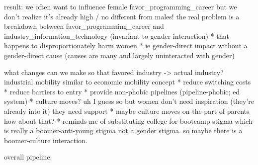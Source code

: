 \documentclass[review]{elsarticle}
\begin{document}




result: we often want to influence female favor_programming_career but we don't realize it's already high / no different from males!
the real problem is a breakdown between favor_programming_career and industry_information_technology (invariant to gender interaction)
    * that happens to disproportionately harm women
    * ie gender-direct impact without a gender-direct cause (causes are many and largely uninteracted with gender)

what changes can we make so that favored industry -> actual industry? industrial mobility similar to economic mobility concept
    * reduce switching costs
    * reduce barriers to entry
    * provide non-phobic pipelines (pipeline-phobic; ed system)
    * culture moves? uh I guess so but women don't need inspiration (they're already into it) they need support
        * maybe culture moves on the part of parents how about that?
        * reminds me of substituting college for bootcamp stigma which is really a boomer-anti-young stigma not a gender stigma. so maybe there is a boomer-culture interaction.

overall pipeline:
\end{document}
